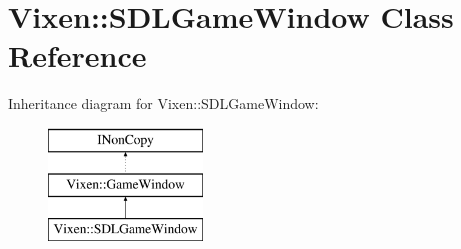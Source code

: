 \hypertarget{class_vixen_1_1_s_d_l_game_window}{}\section{Vixen\+:\+:S\+D\+L\+Game\+Window Class Reference}
\label{class_vixen_1_1_s_d_l_game_window}
Inheritance diagram for Vixen\+:\+:S\+D\+L\+Game\+Window\+:\begin{figure}[H]
\begin{center}
\leavevmode
\includegraphics[height=3.000000cm]{class_vixen_1_1_s_d_l_game_window}
\end{center}
\end{figure}
